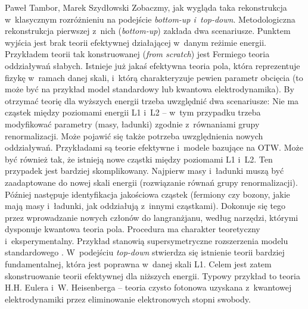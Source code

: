 \begin{artplenv2auth}{Paweł Tambor, Marek Szydłowski}
Zobaczmy, jak wygląda taka rekonstrukcja w~klasycznym rozróżnieniu na podejście \textit{bottom-up i~top-down}. Metodologiczna rekonstrukcja pierwszej z~nich (\textit{bottom-up}) zakłada dwa scenariusze. Punktem wyjścia jest brak teorii efektywnej działającej w~danym reżimie energii. Przykładem teorii tak konstruowanej (\textit{from scratch}) jest Fermiego teoria oddziaływań słabych. Istnieje już jakaś efektywna teoria pola, która reprezentuje fizykę w~ramach danej skali, i~którą charakteryzuje pewien parametr obcięcia (to może być na przykład model standardowy lub kwantowa elektrodynamika). By otrzymać teorię dla wyższych energii trzeba uwzględnić dwa scenariusze: Nie ma cząstek między poziomami energii L1 i~L2 -- w~tym przypadku trzeba modyfikować parametry (masy, ładunki) zgodnie z~równaniami grupy renormalizacji. Może pojawić się także potrzeba uwzględnienia nowych oddziaływań. Przykładami są teorie efektywne i~modele bazujące na OTW. Może być również tak, że istnieją nowe cząstki między poziomami L1 i~L2. Ten przypadek jest bardziej skomplikowany. Najpierw masy i~ładunki muszą być zaadaptowane do nowej skali energii (rozwiązanie równań grupy renormalizacji). Później następuje identyfikacja jakościowa cząstek (fermiony czy bozony, jakie mają masy i~ładunki, jak oddziałują z~innymi cząstkami). Dokonuje się tego przez wprowadzanie nowych członów do langranżjanu, według narzędzi, którymi dysponuje kwantowa teoria pola. Procedura ma charakter teoretyczny i~eksperymentalny. Przykład stanowią supersymetryczne rozszerzenia modelu standardowego
\parencites[][]{cao_conceptual_1993}[por.][]{cao_why_1999}[][]{arnold_metody_1981}[][]{kane_supersymetria_2006}. %
 W~podejściu \textit{top-down} stwierdza się istnienie teorii bardziej fundamentalnej, która jest poprawna w~danej skali L1. Celem jest zatem skonstruowanie teorii efektywnej dla niższych energii. Typowy przykład to teoria H.H. Eulera i~W. Heisenberga -- teoria czysto fotonowa uzyskana z~kwantowej elektrodynamiki przez eliminowanie elektronowych stopni swobody.


\end{artplenv2auth}
